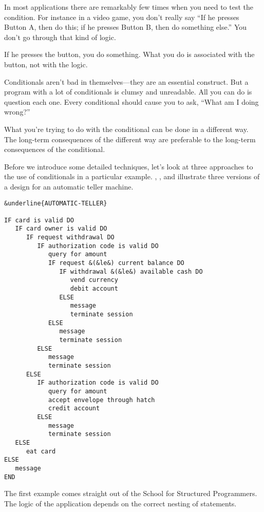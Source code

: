 \begin{interview}
\begin{tfquot}
In most applications there are remarkably few times when you need to test
the condition. For instance in a video game, you don't really say ``If he
presses Button A, then do this; if he presses Button B, then do something
else.'' You don't go through that kind of logic.

If he presses the button, you do something. What you do is associated with
the button, not with the logic.

Conditionals aren't bad in themselves---they are an essential construct. But
a program with a lot of conditionals is clumsy and unreadable. All you can
do is question each one. Every conditional should cause you to ask, ``What
am I doing wrong?''

What you're trying to do with the conditional can be done in a different
way. The long-term consequences of the different way are preferable to the
long-term consequences of the conditional.
\end{tfquot}
\end{interview}%
%
Before we introduce some detailed techniques, let's look at three
approaches to the use of conditionals in a particular example.
, , and  illustrate three versions of
a design for an automatic teller machine.

\begin{figure*}[tttt]
\begin{center}
\small\begin{BVerbatim}[commandchars=\&\{\},baselinestretch=0.85]
&underline{AUTOMATIC-TELLER}

IF card is valid DO
   IF card owner is valid DO
      IF request withdrawal DO
         IF authorization code is valid DO
            query for amount
            IF request &(&le&) current balance DO
               IF withdrawal &(&le&) available cash DO
                  vend currency
                  debit account
               ELSE
                  message
                  terminate session
            ELSE
               message
               terminate session
         ELSE
            message
            terminate session
      ELSE
         IF authorization code is valid DO
            query for amount
            accept envelope through hatch
            credit account
         ELSE
            message
            terminate session
   ELSE
      eat card
ELSE
   message
END
\end{BVerbatim}
\end{center}
\end{figure*}
The first example comes straight out of the School for Structured
Programmers. The logic of the application depends on the correct nesting
of  statements.

